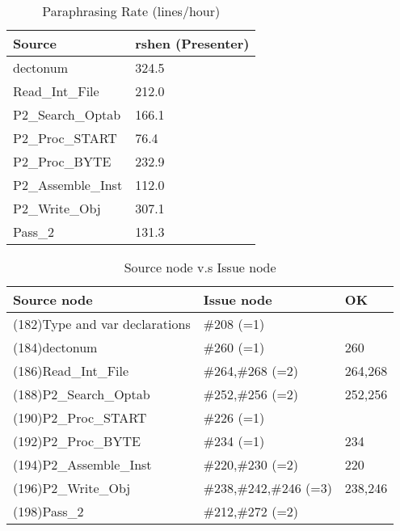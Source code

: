 \begin{table}[hb]
\begin{center}
\begin{tabular}{|l|l|}
\hline
Source & rshen (Presenter)\\
\hline
dectonum & 324.5\\
Read\_Int\_File & 212.0\\
P2\_Search\_Optab & 166.1\\
P2\_Proc\_START & 76.4\\
P2\_Proc\_BYTE & 232.9\\
P2\_Assemble\_Inst & 112.0\\
P2\_Write\_Obj & 307.1\\
Pass\_2 & 131.3\\
\hline
\end{tabular}
\end{center}
\caption{Paraphrasing Rate (lines/hour)}
\end{table}


\begin{table}[hb]
\begin{center}
\begin{tabular}{|l|l|l|}
\hline
Source node & Issue node  & OK\\
\hline
(182)Type and var declarations & \#208 (=1) & \\
(184)dectonum & \#260 (=1) & 260\\
(186)Read\_Int\_File & \#264,\#268 (=2) & 264,268\\
(188)P2\_Search\_Optab & \#252,\#256 (=2) & 252,256\\
(190)P2\_Proc\_START & \#226 (=1) & \\
(192)P2\_Proc\_BYTE & \#234 (=1) & 234\\
(194)P2\_Assemble\_Inst & \#220,\#230 (=2) & 220\\
(196)P2\_Write\_Obj & \#238,\#242,\#246 (=3) & 238,246\\
(198)Pass\_2 & \#212,\#272 (=2) & \\
\hline
\end{tabular}
\caption{Source node v.s Issue node}
\end{center}
\end{table}

